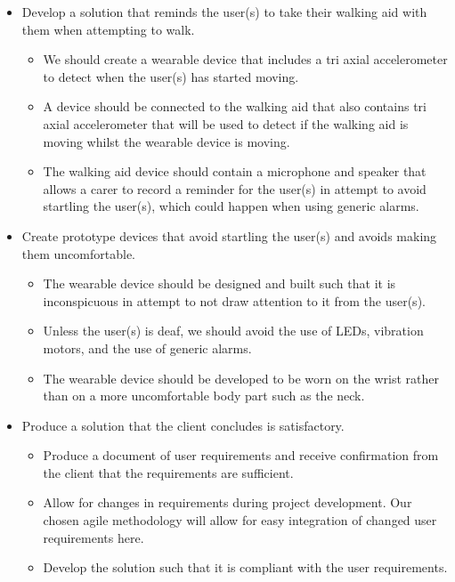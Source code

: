         \begin{itemize}
            \item Develop a solution that reminds the user(s) to take their walking aid with them when attempting to walk.

                    \begin{itemize}
                        \item We should create a wearable device that includes a tri axial accelerometer to detect when the user(s) has started moving.
                        \item A device should be connected to the walking aid that also contains tri axial accelerometer that will be used to detect if the walking aid is moving whilst the wearable device is moving.
                        \item The walking aid device should contain a microphone and speaker that allows a carer to record a reminder for the user(s) in attempt to avoid startling the user(s), which could happen when using generic alarms.
                    \end{itemize}

            \item Create prototype devices that avoid startling the user(s) and avoids making them uncomfortable.

                    \begin{itemize}
                        \item The wearable device should be designed and built such that it is inconspicuous in attempt to not draw attention to it from the user(s).
                        \item Unless the user(s) is deaf, we should avoid the use of LEDs, vibration motors, and the use of generic alarms.
                        \item The wearable device should be developed to be worn on the wrist rather than on a more uncomfortable body part such as the neck.
                    \end{itemize}

            \item Produce a solution that the client concludes is satisfactory.

                    \begin{itemize}
                        \item Produce a document of user requirements and receive confirmation from the client that the requirements are sufficient.
                        \item Allow for changes in requirements during project development. Our chosen agile methodology will allow for easy integration of changed user requirements here.
                        \item Develop the solution such that it is compliant with the user requirements.
                    \end{itemize}

        \end{itemize}
